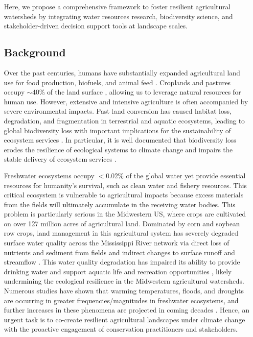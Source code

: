 \documentclass[12pt, class=article, crop=false]{standalone}
\begin{document}
Here, we propose a comprehensive framework to foster resilient agricultural watersheds by integrating water resources research, biodiversity science, and stakeholder-driven decision support tools at landscape scales. 

\subsection{Background}

Over the past centuries, humans have substantially expanded agricultural land use for food production, biofuels, and animal feed \citep{godfray_food_2010, foley_global_2005}.
Croplands and pastures occupy $\sim$40\% of the land surface \citep{foley_global_2005}, allowing us to leverage natural resources for human use.
However, extensive and intensive agriculture is often accompanied by severe environmental impacts.
Past land conversion has caused habitat loss, degradation, and fragmentation in terrestrial and aquatic ecosystems, leading to global biodiversity loss with important implications for the sustainability of ecosystem services \citep{nunes_linking_2022, felipe-lucia_land-use_2020, tilman_global_2011, piggott_climate_2015}.
In particular, it is well documented that biodiversity loss erodes the resilience of ecological systems to climate change \citep{isbell_biodiversity_2015, mori_response_2013, eklof_experimental_2012} and impairs the stable delivery of ecosystem services \citep{duffy_biodiversity_2017, cardinale_biodiversity_2011, tilman_biodiversity_2014}.

Freshwater ecosystems occupy $<$0.02\% of the global water \citep{dodds_freshwater_2017} yet provide essential resources for humanity's survival, such as clean water and fishery resources.
This critical ecosystem is vulnerable to agricultural impacts because excess materials from the fields will ultimately accumulate in the receiving water bodies.
This problem is particularly serious in the Midwestern US, where crops are cultivated on over 127 million acres of agricultural land.
Dominated by corn and soybean row crops, land management in this agricultural system has severely degraded surface water quality across the Mississippi River network via direct loss of nutrients and sediment from fields and indirect changes to surface runoff and streamflow \citep{vitousek_human_1997, turner_linking_2003, blann_effects_2009, foufoula-georgiou_change_2015}.
This water quality degradation has impaired its ability to provide drinking water \citep{pennino_trends_2017, ward_drinking_2018} and support aquatic life \citep{terui_quantifying_2019, hansen_coupling_2016} and recreation opportunities \citep{keeler_linking_2012}, likely undermining the ecological resilience in the Midwestern agricultural watersheds.
Numerous studies have shown that warming temperatures, floods, and droughts are occurring in greater frequencies/magnitudes in freshwater ecosystems, and further increases in these phenomena are projected in coming decades \citep{hirabayashi_global_2013, pryor_high-resolution_2013, reid_emerging_2019}.
Hence, an urgent task is to co-create resilient agricultural landscapes under climate change with the proactive engagement of conservation practitioners and stakeholders.
\end{document}
